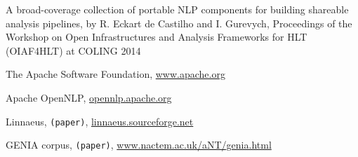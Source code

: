 \documentclass{article}
\newcommand{\TODO}[1]{\texttt{\textcolor{YellowOrange}{(#1)}}} %
\begin{document}
\begin{thebibliography}{99}
    A broad-coverage collection of portable NLP components for building shareable analysis
    pipelines,
    by R. Eckart de Castilho and I. Gurevych,
    Proceedings of the Workshop on Open Infrastructures and Analysis Frameworks for HLT (OIAF4HLT)
    at COLING 2014

    The Apache Software Foundation,
    \href{http://www.apache.org/}{www.apache.org}

    Apache OpenNLP,
    \href{https://opennlp.apache.org/}{opennlp.apache.org}

    Linnaeus,
	\TODO{paper},
    \href{http://linnaeus.sourceforge.net/}{linnaeus.sourceforge.net}

    GENIA corpus,
	\TODO{paper},
    \href{http://www.nactem.ac.uk/aNT/genia.html}{www.nactem.ac.uk/aNT/genia.html}


\end{thebibliography}

\end{document}
